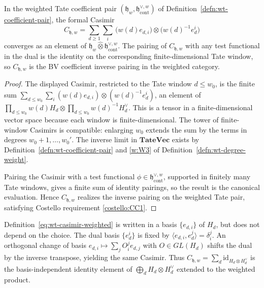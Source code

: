 \begin{prop}\label{prop:wt-casimir-convergence}
  In the weighted Tate coefficient pair
  $(\mathfrak h_w,\mathfrak h^{\vee,w}_{\mathrm{cont}})$ of
  Definition~\ref{defn:wt-coefficient-pair}, the formal Casimir
  \begin{equation}\label{eq:wt-casimir-weighted}
    C_{\mathfrak h,w}=\sum_{d\geq1}\sum_i\,
      \bigl(w(d)e_{d,i}\bigr)\otimes
      \bigl(w(d)^{-1}e^i_d\bigr)
  \end{equation}
  converges as an element of
  $\mathfrak h_w\widehat\otimes
  \mathfrak h^{\vee,w}_{\mathrm{cont}}$. The pairing of
  $C_{\mathfrak h,w}$ with any test functional in the dual is the
  identity on the corresponding finite-dimensional Tate window, so
  $C_{\mathfrak h,w}$ is the BV coefficient inverse pairing in the
  weighted category.
\end{prop}

\begin{proof}
  The displayed Casimir, restricted to the Tate window $d\leq w_0$,
  is the finite sum
  $\sum_{d\leq w_0}\sum_i(w(d)e_{d,i})\otimes(w(d)^{-1}e^i_d)$, an
  element of $\prod_{d\leq w_0}w(d)H_d\otimes\prod_{d\leq w_0}
  w(d)^{-1}H_d^\vee$. This is a tensor in a finite-dimensional vector
  space because each window is finite-dimensional. The tower of
  finite-window Casimirs is compatible: enlarging $w_0$ extends the
  sum by the terms in degrees $w_0+1,\ldots,w_0'$. The inverse limit
  in $\mathbf{TateVec}$ exists by Definition~\ref{defn:wt-coefficient-pair}
  and \ref{w:W3} of Definition~\ref{defn:wt-degree-weight}.

  Pairing the Casimir with a test functional $\phi\in
  \mathfrak h^{\vee,w}_{\mathrm{cont}}$, supported in finitely many
  Tate windows, gives a finite sum of identity pairings, so the
  result is the canonical evaluation. Hence $C_{\mathfrak h,w}$
  realizes the inverse pairing on the weighted Tate pair, satisfying
  Costello requirement \ref{costello:CC1}.
\end{proof}

\begin{rmk}\label{rmk:wt-basis-independence}
  Definition~\eqref{eq:wt-casimir-weighted} is written in a basis
  $\{e_{d,i}\}$ of $H_d$, but does not depend on the choice. The dual basis
  $\{e^i_d\}$ is fixed by $\langle e_{d,i},e^j_d\rangle=\delta_i^j$.
  An orthogonal change of basis $e_{d,i}\mapsto\sum_j O_i^je_{d,j}$
  with $O\in GL(H_d)$ shifts the dual by the inverse transpose,
  yielding the same Casimir. Thus
  $C_{\mathfrak h,w}=\sum_d\mathrm{id}_{H_d\otimes H_d^\vee}$ is the
  basis-independent identity element of $\bigoplus_d H_d\otimes
  H_d^\vee$ extended to the weighted product.
\end{rmk}

